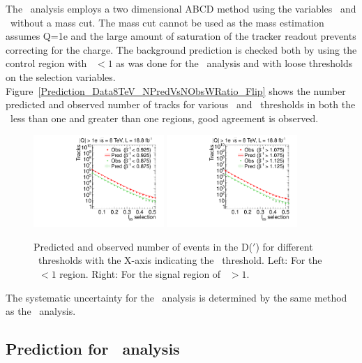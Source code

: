 The \multi\ analysis employs a two dimensional ABCD method using the variables \invbeta\ and \ias\ without a mass cut. The mass cut cannot be used as the mass
estimation assumes Q=1e and the large amount of saturation of the tracker readout prevents correcting for the charge. The background prediction is checked both by using 
the control region with \invbeta\ $< 1$ as was done for the \muononly\ analysis and with loose thresholds on the selection variables.
Figure~\ref{Prediction_Data8TeV_NPredVsNObsWRatio_Flip} shows the number
predicted and observed number of tracks for various \invbeta\ and \ias\ thresholds in both the \invbeta\ less than one and greater than one regions, good agreement is observed.

\begin{figure}
 \begin{center}
  \includegraphics[clip=true, trim=0.0cm 0cm 2.8cm 0cm,width=0.44\textwidth]{figures/multi/Prediction_Data8TeV_NPredVsNObs_Flip}
  \includegraphics[clip=true, trim=0.0cm 0cm 2.8cm 0cm,width=0.44\textwidth]{figures/multi/Prediction_Data8TeV_NPredVsNObs}
 \end{center}
 \caption{Predicted and observed number of events in the D($\prime$) for different \invbeta\ thresholds with the X-axis indicating the \ias\ threshold.
Left: For the \invbeta\ $< 1$ region. Right: For the signal region of \invbeta\ $> 1$.
\label{fig:MultiPred}}
\end{figure}

The systematic uncertainty for the \multi\ analysis is determined by the same method as the \muononly\ analysis.

\subsection{Prediction for \fract\ analysis}


